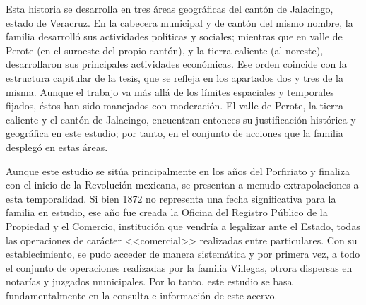 \documentclass[14pt,twoside,final]{extbook} %
\begin{document}
Esta historia se desarrolla en tres áreas geográficas del cantón de Jalacingo, estado de Veracruz. En la cabecera municipal y de cantón del mismo nombre, la familia desarrolló sus actividades políticas y sociales; mientras que en valle de Perote (en el suroeste del propio cantón), y la tierra caliente (al noreste), desarrollaron sus principales actividades económicas. Ese orden coincide con la estructura capitular de la tesis, que se refleja en los apartados dos y tres de la misma. Aunque el trabajo va más allá de los límites espaciales y temporales fijados, éstos han sido manejados con moderación. El valle de Perote, la tierra caliente y el cantón de Jalacingo, encuentran entonces su justificación histórica y geográfica en este estudio; por tanto, en el conjunto de acciones que la familia desplegó en estas áreas.

Aunque este estudio se sitúa principalmente en los años del Porfiriato y finaliza con el inicio de la Revolución mexicana, se presentan a menudo extrapolaciones a esta temporalidad. Si bien 1872 no representa una fecha significativa para la familia en estudio, ese año fue creada la Oficina del Registro Público de la Propiedad y el Comercio, institución que vendría a legalizar ante el Estado, todas las operaciones de carácter <<comercial>> realizadas entre particulares. Con su establecimiento, se pudo acceder de manera sistemática y por primera vez, a todo el conjunto de operaciones realizadas por la familia Villegas, otrora dispersas en notarías y juzgados municipales. Por lo tanto, este estudio se basa fundamentalmente en la consulta e información de este acervo.
\end{document}
